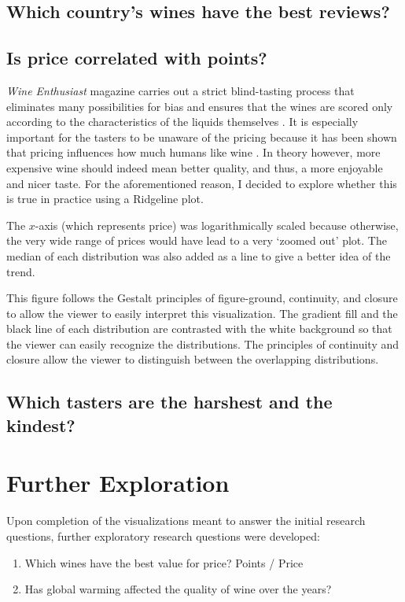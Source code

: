 \documentclass[11pt, twocolumn]{article}
\begin{document}
\subsection{Which country's wines have the best reviews?}



\subsection{Is price correlated with points?}
\emph{Wine Enthusiast} magazine carries out a strict blind-tasting process that eliminates many possibilities for bias and ensures that the wines are scored only according to the characteristics of the liquids themselves \cite{WineMag}. It is especially important for the tasters to be unaware of the pricing because it has been shown that pricing influences how much humans like wine \cite{SchmidtSkvortsova2017}. In theory however, more expensive wine should indeed mean better quality, and thus, a more enjoyable and nicer taste. For the aforementioned reason, I decided to explore whether this is true in practice using a Ridgeline plot. 

The $x$-axis (which represents price) was logarithmically scaled because otherwise, the very wide range of prices would have lead to a very `zoomed out' plot. The median of each distribution was also added as a line to give a better idea of the trend.

This figure follows the Gestalt principles of figure-ground, continuity, and closure to allow the viewer to easily interpret this visualization. The gradient fill and the black line of each distribution are contrasted with the white background so that the viewer can easily recognize the distributions. The principles of continuity and closure allow the viewer to distinguish between the overlapping distributions.

\subsection{Which tasters are the harshest and the kindest?}



\section{Further Exploration}

Upon completion of the visualizations meant to answer the initial research questions, further exploratory research questions were developed:

\begin{enumerate}
  \item Which wines have the best value for price? Points / Price
  \item Has global warming affected the quality of wine over the years?
\end{enumerate}


\end{document}
